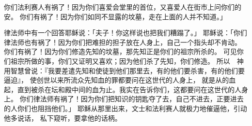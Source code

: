 {你们法利赛人有祸了！因为你们喜爱会堂里的首位，又喜爱人在街市上问你们的安。
你们有祸了！因为你们如同不显露的坟墓，走在上面的人并不知道。」
\par }{\PP {}律法师中有一个回答耶稣说：「夫子！你这样说也把我们糟蹋了。」
耶稣说：「你们律法师也有祸了！因为你们把难担的担子放在人身上，自己一个指头却不肯动。
你们有祸了！因为你们修造先知的坟墓，那先知正是你们的祖宗所杀的。
可见你们祖宗所做的事，你们又证明又喜欢；因为他们杀了先知，你们修造{}。
所以　神用智慧曾说：『我要差遣先知和使徒到他们那里去，有的他们要杀害，有的他们要逼迫』，
使创世以来所流众先知血的罪都要问在这世代的人身上，
就是从{}的血起，直到被杀在坛和殿中间{}的血为止。我实在告诉你们，这都要问在这世代的人身上。
你们律法师有祸了！因为你们把知识的钥匙夺了去，自己不进去，正要进去的人你们也阻挡他们。」
耶稣从那里出来，文士和法利赛人就极力地催逼他，引动他多说话，
私下窥听，要拿他的话柄。

}
